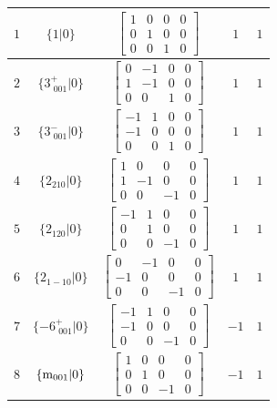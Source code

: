 \documentclass[fleqn,8pt]{jsarticle}
\begin{document}
\begin{longtable}{ccccc}
$ 1 $ & $ \{1|0\} $ & $ \begin{bmatrix} 1 & 0 & 0 & 0 \\ 0 & 1 & 0 & 0 \\ 0 & 0 & 1 & 0 \end{bmatrix} $ & $ 1 $ & $ 1 $ \\ \hline
$ 2 $ & $ \{3^{+}_{\,\,001}|0\} $ & $ \begin{bmatrix} 0 & -1 & 0 & 0 \\ 1 & -1 & 0 & 0 \\ 0 & 0 & 1 & 0 \end{bmatrix} $ & $ 1 $ & $ 1 $ \\ \hline
$ 3 $ & $ \{3^{-}_{\,\,001}|0\} $ & $ \begin{bmatrix} -1 & 1 & 0 & 0 \\ -1 & 0 & 0 & 0 \\ 0 & 0 & 1 & 0 \end{bmatrix} $ & $ 1 $ & $ 1 $ \\ \hline
$ 4 $ & $ \{2{}_{210}|0\} $ & $ \begin{bmatrix} 1 & 0 & 0 & 0 \\ 1 & -1 & 0 & 0 \\ 0 & 0 & -1 & 0 \end{bmatrix} $ & $ 1 $ & $ 1 $ \\ \hline
$ 5 $ & $ \{2{}_{120}|0\} $ & $ \begin{bmatrix} -1 & 1 & 0 & 0 \\ 0 & 1 & 0 & 0 \\ 0 & 0 & -1 & 0 \end{bmatrix} $ & $ 1 $ & $ 1 $ \\ \hline
$ 6 $ & $ \{2{}_{1-10}|0\} $ & $ \begin{bmatrix} 0 & -1 & 0 & 0 \\ -1 & 0 & 0 & 0 \\ 0 & 0 & -1 & 0 \end{bmatrix} $ & $ 1 $ & $ 1 $ \\ \hline
$ 7 $ & $ \{-6^{+}_{\,\,001}|0\} $ & $ \begin{bmatrix} -1 & 1 & 0 & 0 \\ -1 & 0 & 0 & 0 \\ 0 & 0 & -1 & 0 \end{bmatrix} $ & $ -1 $ & $ 1 $ \\ \hline
$ 8 $ & $ \{{\rm m}_{001}|0\} $ & $ \begin{bmatrix} 1 & 0 & 0 & 0 \\ 0 & 1 & 0 & 0 \\ 0 & 0 & -1 & 0 \end{bmatrix} $ & $ -1 $ & $ 1 $ \\ \hline

\end{longtable}
\end{document}
